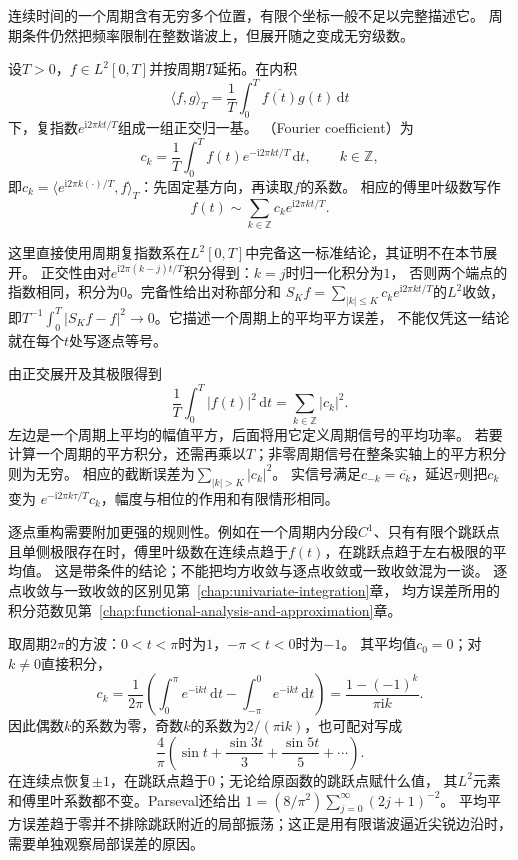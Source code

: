连续时间的一个周期含有无穷多个位置，有限个坐标一般不足以完整描述它。
周期条件仍然把频率限制在整数谐波上，但展开随之变成无穷级数。
\begin{definition}[周期信号的傅里叶系数与级数]
  \label{def:signal-analysis-fourier-series}
  设$T>0$，$f\in L^2[0,T]$并按周期$T$延拓。在内积
  \[
    \langle f,g\rangle_T=\frac1T\int_0^T \overline{f(t)}g(t)\,\mathrm dt
  \]
  下，复指数$e^{\mathrm i2\pi kt/T}$组成一组正交归一基。
  （Fourier coefficient）为
  \[
    c_k=\frac1T\int_0^T f(t)e^{-\mathrm i2\pi kt/T}\,\mathrm dt,
    \qquad k\in\mathbb Z,
  \]
  即$c_k=\langle e^{\mathrm i2\pi k(\cdot)/T},f\rangle_T$：先固定基方向，再读取$f$的系数。
  相应的傅里叶级数写作
  \begin{equation}
    f(t)\sim\sum_{k\in\mathbb Z}c_ke^{\mathrm i2\pi kt/T}.
    \label{eq:signal-analysis-fourier-series}
  \end{equation}
\end{definition}
这里直接使用周期复指数系在$L^2[0,T]$中完备这一标准结论，其证明不在本节展开。
正交性由对$e^{\mathrm i2\pi(k-j)t/T}$积分得到：$k=j$时归一化积分为$1$，
否则两个端点的指数相同，积分为$0$。完备性给出对称部分和
$S_Kf=\sum_{|k|\leq K}c_ke^{\mathrm i2\pi kt/T}$的$L^2$收敛，
即$T^{-1}\int_0^T|S_Kf-f|^2\to0$。它描述一个周期上的平均平方误差，
不能仅凭这一结论就在每个$t$处写逐点等号。

由正交展开及其极限得到
\begin{equation}
  \frac1T\int_0^T|f(t)|^2\,\mathrm dt
  =\sum_{k\in\mathbb Z}|c_k|^2.
  \label{eq:signal-analysis-continuous-parseval}
\end{equation}
左边是一个周期上平均的幅值平方，后面将用它定义周期信号的平均功率。
若要计算一个周期的平方积分，还需再乘以$T$；非零周期信号在整条实轴上的平方积分则为无穷。
相应的截断误差为$\sum_{|k|>K}|c_k|^2$。
实信号满足$c_{-k}=\overline{c_k}$，延迟$\tau$则把$c_k$变为
$e^{-\mathrm i2\pi k\tau/T}c_k$，幅度与相位的作用和有限情形相同。

逐点重构需要附加更强的规则性。例如在一个周期内分段$C^1$、只有有限个跳跃点
且单侧极限存在时，傅里叶级数在连续点趋于$f(t)$，在跳跃点趋于左右极限的平均值。
这是带条件的结论；不能把均方收敛与逐点收敛或一致收敛混为一谈。
逐点收敛与一致收敛的区别见第~\ref{chap:univariate-integration}章，
均方误差所用的积分范数见第~\ref{chap:functional-analysis-and-approximation}章。

取周期$2\pi$的方波：$0<t<\pi$时为$1$，$-\pi<t<0$时为$-1$。
其平均值$c_0=0$；对$k\neq0$直接积分，
\[
  c_k=\frac1{2\pi}\left(
    \int_0^\pi e^{-\mathrm ikt}\,\mathrm dt
    -\int_{-\pi}^0 e^{-\mathrm ikt}\,\mathrm dt\right)
  =\frac{1-(-1)^k}{\pi\mathrm ik}.
\]
因此偶数$k$的系数为零，奇数$k$的系数为$2/(\pi\mathrm ik)$，也可配对写成
\[
  \frac4\pi\left(\sin t+\frac{\sin3t}{3}+\frac{\sin5t}{5}+\cdots\right).
\]
在连续点恢复$\pm1$，在跳跃点趋于$0$；无论给原函数的跳跃点赋什么值，
其$L^2$元素和傅里叶系数都不变。Parseval还给出
$1=(8/\pi^2)\sum_{j=0}^{\infty}(2j+1)^{-2}$。
平均平方误差趋于零并不排除跳跃附近的局部振荡；这正是用有限谐波逼近尖锐边沿时，
需要单独观察局部误差的原因。

